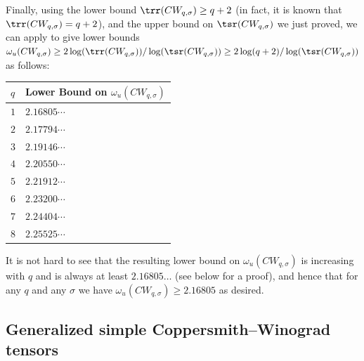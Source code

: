 \documentclass{toc}
\begin{document}
Finally, using the lower bound $\trr(CW_{q,\sigma}) \geq q+2$ (in fact, it is known that $\trr(CW_{q,\sigma}) = q+2$), and the upper bound on $\tsr(CW_{q,\sigma})$ we just proved, we can apply  to give lower bounds $\omega_u(CW_{q,\sigma}) \geq 2 \log(\trr(CW_{q,\sigma})) / \log(\tsr(CW_{q,\sigma})) \geq 2 \log(q+2) / \log(\tsr(CW_{q,\sigma}))$ as follows:

\begin{center}
\begin{tabular}{l|l}
$q$ & Lower Bound on $\omega_u(CW_{q,\sigma})$ \\ \hline
$1$                                & $2.16805\cdots$                                                        \\
$2$                                & $2.17794\cdots$                                                        \\
$3$                                & $2.19146\cdots$                                                        \\
$4$                                & $2.20550\cdots$                                                        \\
$5$                                & $2.21912\cdots$                                                           \\
$6$                                & $2.23200\cdots$                                                       \\
$7$                                & $2.24404\cdots$                                                       \\
$8$                                & $2.25525\cdots$                                                        
\end{tabular}
\end{center}

It is not hard to see that the resulting lower bound on $\omega_u(CW_{q,\sigma})$ is increasing with $q$ and is always at least $2.16805\ldots$ (see  below for a proof), and hence that for any $q$ and any $\sigma$ we have $\omega_u(CW_{q,\sigma}) \geq 2.16805$ as desired.





%
\subsection{Generalized simple Coppersmith--Winograd tensors} \label{subsec:gensimplecw}
\end{document}
